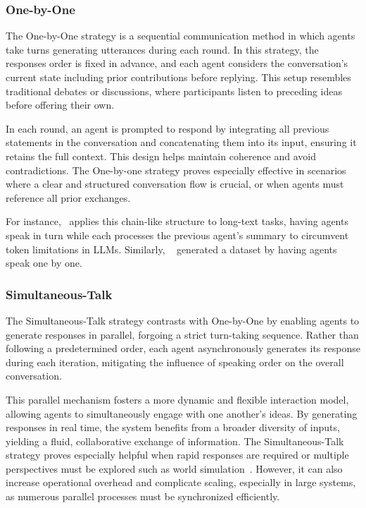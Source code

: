 \subsubsection{One-by-One}
The One-by-One strategy is a sequential communication method in which agents take turns generating utterances during each round. In this strategy, the responses order is fixed in advance, and each agent considers the conversation's current state including prior contributions before replying. This setup resembles traditional debates or discussions, where participants listen to preceding ideas before offering their own.

In each round, an agent is prompted to respond by integrating all previous statements in the conversation and concatenating them into its input, ensuring it retains the full context. This design helps maintain coherence and avoid contradictions. The One-by-one strategy proves especially effective in scenarios where a clear and structured conversation flow is crucial, or when agents must reference all prior exchanges.

For instance, ~\cite{chain_of_agents}applies this chain-like structure to long-text tasks, having agents speak in turn while each processes the previous agent’s summary to circumvent token limitations in LLMs. Similarly, ~\cite{dataset_generation} generated a dataset by having agents speak one by one.

\subsubsection{Simultaneous-Talk}
The Simultaneous-Talk strategy contrasts with One-by-One by enabling agents to generate responses in parallel, forgoing a strict turn-taking sequence. Rather than following a predetermined order, each agent asynchronously generates its response during each iteration, mitigating the influence of speaking order on the overall conversation.

This parallel mechanism fosters a more dynamic and flexible interaction model, allowing agents to simultaneously engage with one another's ideas. By generating responses in real time, the system benefits from a broader diversity of inputs, yielding a fluid, collaborative exchange of information. The Simultaneous-Talk strategy proves especially helpful when rapid responses are required or multiple perspectives must be explored such as world simulation~\cite{simulating_opinion_dynamic,classroom_simulation,richeliey_diplomacy_society}. However,  it can also increase operational overhead and complicate scaling, especially in large systems, as numerous parallel processes must be synchronized efficiently.

